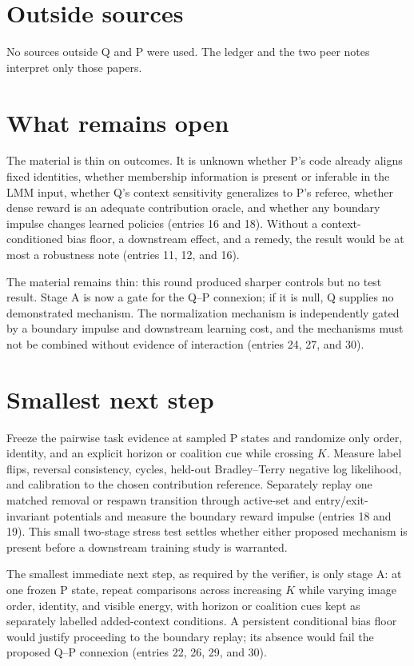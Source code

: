 \documentclass{article}
\begin{document}
\section*{Outside sources}
No sources outside Q and P were used. The ledger and the two peer notes interpret only those papers.

\section*{What remains open}
The material is thin on outcomes. It is unknown whether P's code already aligns
fixed identities, whether membership information is present or inferable in the
LMM input, whether Q's context sensitivity generalizes to P's referee, whether
dense reward is an adequate contribution oracle, and whether any boundary
impulse changes learned policies (entries 16 and 18). Without a
context-conditioned bias floor, a downstream effect, and a remedy, the result
would be at most a robustness note (entries 11, 12, and 16).

The material remains thin: this round produced sharper controls but no test
result. Stage A is now a gate for the Q--P connexion; if it is null, Q supplies
no demonstrated mechanism. The normalization mechanism is independently gated
by a boundary impulse and downstream learning cost, and the mechanisms must not
be combined without evidence of interaction (entries 24, 27, and 30).

\section*{Smallest next step}
Freeze the pairwise task evidence at sampled P states and randomize only order,
identity, and an explicit horizon or coalition cue while crossing $K$. Measure
label flips, reversal consistency, cycles, held-out Bradley--Terry negative log
likelihood, and calibration to the chosen contribution reference. Separately
replay one matched removal or respawn transition through active-set and
entry/exit-invariant potentials and measure the boundary reward impulse
(entries 18 and 19). This small two-stage stress test settles whether either
proposed mechanism is present before a downstream training study is warranted.

The smallest immediate next step, as required by the verifier, is only stage A:
at one frozen P state, repeat comparisons across increasing $K$ while varying
image order, identity, and visible energy, with horizon or coalition cues kept
as separately labelled added-context conditions. A persistent conditional bias
floor would justify proceeding to the boundary replay; its absence would fail
the proposed Q--P connexion (entries 22, 26, 29, and 30).
\end{document}
